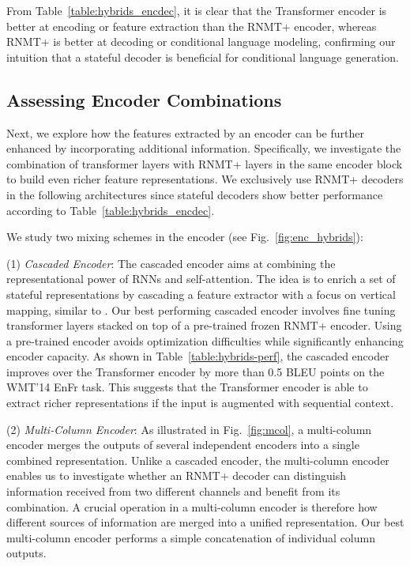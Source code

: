 \documentclass[11pt,a4paper]{article}
\begin{document}
From Table~\ref{table:hybrids_encdec}, it is clear that the Transformer
encoder is better at encoding or feature extraction than the RNMT+
encoder, whereas RNMT+ is better at decoding or conditional language
modeling, confirming our intuition that a stateful decoder is
beneficial for conditional language generation.

\subsection{Assessing Encoder Combinations}
Next, we explore how the features extracted by an encoder can be
further enhanced by incorporating additional
information. Specifically, we investigate the combination of
transformer layers with RNMT+ layers in the same encoder block to build even richer feature representations.
We exclusively use RNMT+ decoders in the following architectures since stateful
decoders show better performance according to Table~\ref{table:hybrids_encdec}.









We study two mixing schemes in the encoder (see Fig.~\ref{fig:enc_hybrids}):

(1) \textit{Cascaded Encoder}: The cascaded encoder aims at combining
the representational power of RNNs and self-attention. The idea is to
enrich a set of stateful representations by cascading a feature
extractor with a focus on vertical mapping, similar to
\cite{DBLP:journals/corr/PascanuGCB13,D17-1300}.  Our best performing
cascaded encoder involves fine tuning transformer layers stacked on
top of a pre-trained frozen RNMT+ encoder.  Using a pre-trained
encoder avoids optimization difficulties while significantly enhancing encoder
capacity. As shown in Table~\ref{table:hybrids-perf},
the cascaded encoder improves over the Transformer encoder by more
than 0.5 BLEU points on the WMT'14 EnFr task. This
suggests that the Transformer encoder is able to extract richer
representations if the input is augmented with sequential context.








(2) \textit{Multi-Column Encoder}:
As illustrated in Fig.~\ref{fig:mcol}, a multi-column encoder merges
the outputs of several independent encoders into a single
combined representation.
Unlike a cascaded encoder, the multi-column encoder enables us to investigate
whether an RNMT+ decoder can distinguish information received
from two different channels and benefit from its combination.
A crucial operation in a multi-column encoder is therefore how
different sources of information are merged into
a unified representation. Our best multi-column encoder performs a simple
concatenation of individual column outputs.
\end{document}
